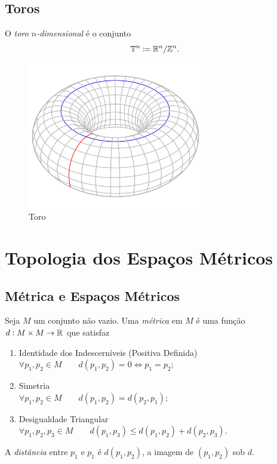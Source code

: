 \section{Toros}

\begin{defi}
	O \emph{toro $n$-dimensional} é o conjunto
	\begin{equation*}
	\T^n \coloneqq \R^n / \Z^n.
	\end{equation*}
\end{defi}

\begin{figure}[!h]
\centering
\includegraphics[width=3in]{./imagens/toro}
\caption{Toro}
\end{figure}


\chapter{Topologia dos Espaços Métricos}

\section{Métrica e Espaços Métricos}

\begin{defi}
	Seja $M$ um conjunto não vazio. Uma \emph{métrica} em $M$ é uma função $d: M \times M \to \mathbb{R}$ que satisfaz
	\begin{enumerate}
	\item Identidade dos Indescerníveis (Positiva Definida)\\
	$\forall p_1,p_2 \in M \qquad d(p_1,p_2)=0 \Leftrightarrow p_1=p_2$;
	\item Simetria \\
	$\forall p_1,p_2 \in M \qquad d(p_1,p_2)=d(p_2,p_1)$;
	\item Desigualdade Triangular \\
	$\forall p_1,p_2,p_3 \in M \qquad d(p_1,p_3) \leq d(p_1,p_2) + d(p_2,p_3)$.
	\end{enumerate}
	A \emph{distância} entre $p_1$ e $p_1$ é $d(p_1,p_2)$, a imagem de $(p_1,p_2)$ sob $d$.
\end{defi}

